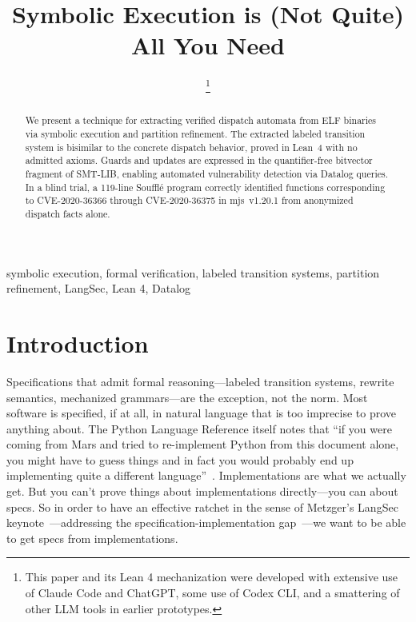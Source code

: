\documentclass[conference]{./template/IEEEtran}
\begin{document}
\title{Symbolic Execution is (Not Quite) All You Need}

\author{
\thanks{This paper and its Lean 4 mechanization were developed with extensive use of Claude Code and ChatGPT, some use of Codex CLI, and a smattering of other LLM tools in earlier prototypes.}
}

\maketitle

\begin{abstract}
We present a technique for extracting verified dispatch automata from ELF binaries via symbolic execution and partition refinement. The extracted labeled transition system is bisimilar to the concrete dispatch behavior, proved in Lean~4 with no admitted axioms. Guards and updates are expressed in the quantifier-free bitvector fragment of SMT-LIB, enabling automated vulnerability detection via Datalog queries. In a blind trial, a 119-line Souffl\'{e} program correctly identified functions corresponding to CVE-2020-36366 through CVE-2020-36375 in mjs~v1.20.1 from anonymized dispatch facts alone.
\end{abstract}

\begin{IEEEkeywords}
symbolic execution, formal verification, labeled transition systems, partition refinement, LangSec, Lean 4, Datalog
\end{IEEEkeywords}

\section{Introduction}

Specifications that admit formal reasoning---labeled transition systems, rewrite semantics, mechanized grammars---are the exception, not the norm. Most software is specified, if at all, in natural language that is too imprecise to prove anything about. The Python Language Reference itself notes that ``if you were coming from Mars and tried to re-implement Python from this document alone, you might have to guess things and in fact you would probably end up implementing quite a different language''~\cite{python2026reference}. Implementations are what we actually get. But you can't prove things about implementations directly---you can about specs. So in order to have an effective ratchet in the sense of Metzger's LangSec keynote~\cite{metzger2017ratchet}---addressing the specification-implementation gap~\cite{sassaman2013security}---we want to be able to get specs from implementations.
\end{document}
